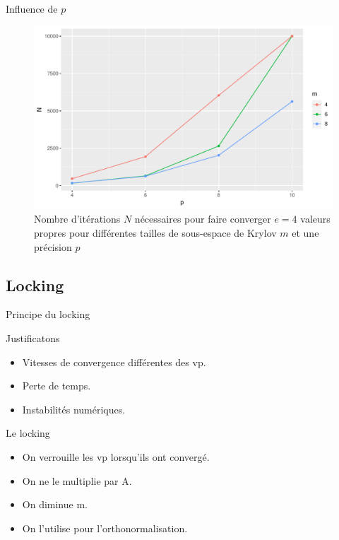 \documentclass[9.5pt]{beamer}
\begin{document}
		\begin{frame}{Influence de $p$}
			\begin{figure}
				\centering
				\includegraphics[width=0.8\linewidth, keepaspectratio]{../rapport/plots/Nvsp-m_e4.pdf}
				\caption{Nombre d'itérations $N$ nécessaires pour faire converger $e = 4$ valeurs propres pour différentes tailles de sous-espace de Krylov $m$ et une précision $p$ \label{fig:Nvsp-m_e4}}
			\end{figure}
		\end{frame}

	\subsection{Locking}
		\begin{frame}{Principe du locking}
			\begin{block}{Justificatons}
				\begin{itemize}
					\item Vitesses de convergence différentes des vp.
					\item Perte de temps.
					\item Instabilités numériques.
				\end{itemize}
			\end{block}

			\begin{exampleblock}{Le locking}
				\begin{itemize}
					\item On verrouille les vp lorsqu'ils ont convergé.
					\item On ne le multiplie par A.
					\item On diminue m.
					\item On l'utilise pour l'orthonormalisation.
				\end{itemize}
			\end{exampleblock}
		\end{frame}
\end{document}
